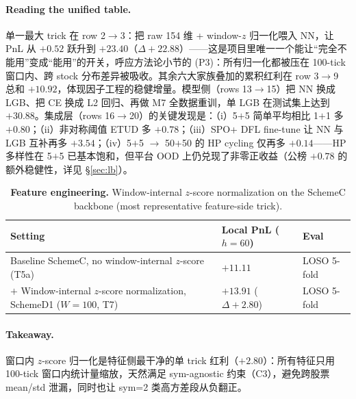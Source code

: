 \documentclass[11pt]{article}
\begin{document}
\paragraph{Reading the unified table.}
单一最大 trick 在 row 2$\to$3：把 raw 154 维 + window-$z$ 归一化喂入 NN，让 PnL 从 $+0.52$ 跃升到 $+23.40$（$\Delta+22.88$）——这是项目里唯一一个能让``完全不能用''变成``能用''的开关，呼应方法论小节的 (P3)：所有归一化都被压在 100-tick 窗口内、跨 stock 分布差异被吸收。其余六大家族叠加的累积红利在 row 3$\to$9 总和 $+10.92$，体现因子工程的稳健增量。模型侧（rows 13$\to$15）把 NN 换成 LGB、把 CE 换成 L2 回归、再做 M7 全数据重训，单 LGB 在测试集上达到 $+30.88$。集成层（rows 16$\to$20）的关键发现是：（i）5$+$5 简单平均相比 1$+$1 多 $+0.80$；（ii）非对称阈值 ETUD 多 $+0.78$；（iii）SPO+ DFL fine-tune 让 NN 与 LGB 互补再多 $+3.54$；（iv）5$+$5 $\to$ 50$+$50 的 HP cycling 仅再多 $+0.14$——HP 多样性在 5$+$5 已基本饱和，但平台 OOD 上仍兑现了非零正收益（公榜 $+0.78$ 的额外稳健性，详见 \S\ref{sec:lb}）。

\begin{table}[!htbp]
\centering
\caption{\textbf{Feature engineering.} Window-internal $z$-score normalization on the SchemeC backbone (most representative feature-side trick).}
\label{tab:abl_feat}
\setlength{\tabcolsep}{5pt}\renewcommand{\arraystretch}{1.15}
\small
\begin{tabularx}{\textwidth}{@{}>{\raggedright\arraybackslash}X >{\raggedleft\arraybackslash}p{3.6cm} >{\raggedright\arraybackslash}p{3.6cm}@{}}
\toprule
Setting & Local PnL ($h{=}60$) & Eval \\
\midrule
Baseline SchemeC, no window-internal $z$-score (T5a) & $+11.11$ & LOSO 5-fold \\
$+$ Window-internal $z$-score normalization, SchemeD1 ($W{=}100$, T7) & $+13.91$ ($\Delta+2.80$) & LOSO 5-fold \\
\bottomrule
\end{tabularx}
\end{table}

\paragraph{Takeaway.}
窗口内 $z$-score 归一化是特征侧最干净的单 trick 红利（$+2.80$）：所有特征只用 100-tick 窗口内统计量缩放，天然满足 sym-agnostic 约束（C3），避免跨股票 mean/std 泄漏，同时也让 sym=2 类高方差段从负翻正。
\end{document}
